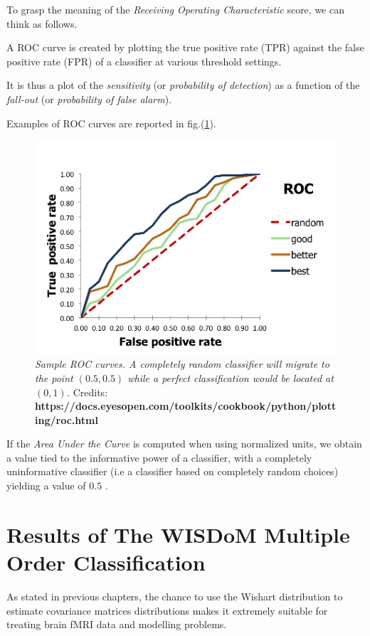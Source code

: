 \documentclass[12pt,openright,twoside,a4paper]{book}
\begin{document}
To grasp the meaning of the \textit{Receiving Operating Characteristic} score, we can think as follows. 

A ROC  curve is created by plotting the true positive rate (TPR) against the false positive rate (FPR) of a classifier at various threshold settings.

It is thus a plot of the \textit{sensitivity} (or \textit{probability of detection}) as a function of the \textit{fall-out} (or \textit{probability of false alarm}). 
\vspace{5mm}

Examples of ROC curves are reported in fig.(\ref{ADNI-roc}).

\begin{figure}[!h]
\centering
\includegraphics[scale=0.65]{roc-theory-small}
\caption{\textit{Sample ROC curves. A completely random classifier will migrate to the point $(0.5,0.5)$ while a perfect classification would be located at $(0,1)$.}
Credits: \textbf{https://docs.eyesopen.com/toolkits/cookbook/python/plotting/roc.html}}
\label{ADNI-roc}
\end{figure}

If the \textit{Area Under the Curve} is computed when using normalized units, we obtain a value tied to the informative power of a classifier, with a completely uninformative classifier (i.e a classifier based on completely random choices) yielding a value of $0.5$ \cite{ROC}.


\chapter{Results of The WISDoM Multiple Order Classification}

As stated in previous chapters, the chance to use the Wishart distribution to estimate covariance matrices distributions makes it extremely suitable for treating brain fMRI data and modelling problems.
\end{document}
